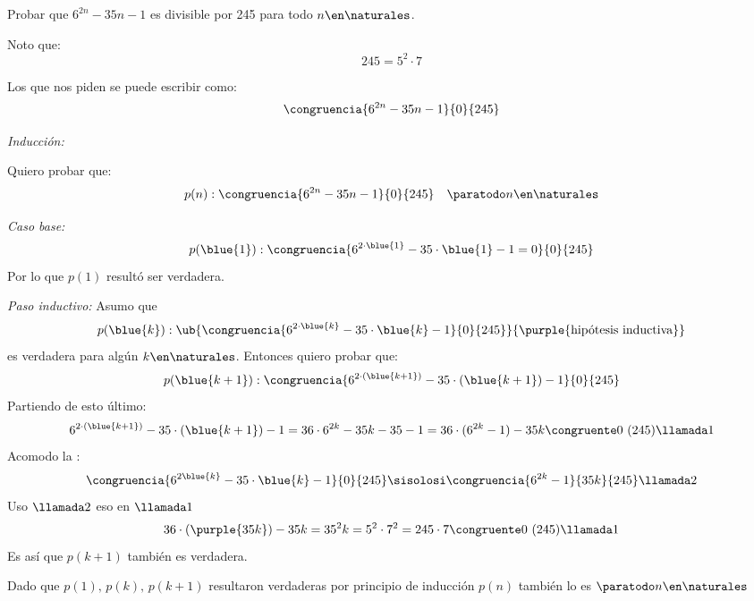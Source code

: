 \begin{enunciado}{\ejExtra}
	Probar que $6^{2n} - 35n -1$ es divisible por 245 para todo $n \en \naturales$.
\end{enunciado}

Noto que:
$$
	245 = 5^2 \cdot 7
$$

Los que nos piden se puede escribir como:
$$
	\congruencia{6^{2n} - 35n -1}{0}{245}
$$

\textit{Inducción:}

Quiero probar que:
$$
	p(n) : \congruencia{6^{2n} - 35n -1}{0}{245} \quad \paratodo n \en \naturales
$$

\medskip

\textit{Caso base:}
$$
	p(\blue{1}) :
	\congruencia{
		6^{2 \cdot \blue{1}} - 35 \cdot {\blue{1}} -1 = 0 }{0}{245}
$$
Por lo que $p(1)$ resultó ser verdadera.

\medskip

\textit{Paso inductivo:}
Asumo que
$$
	p(\blue{k}) : \ub{\congruencia{ 6^{2 \cdot \blue{k}} - 35 \cdot {\blue{k}} -1}{0}{245}}{\purple{\text{hipótesis inductiva}}}
$$
es verdadera para algún $k \en \naturales$. Entonces quiero probar que:
$$
	p(\blue{k+1}) : \congruencia{ 6^{2 \cdot (\blue{k+1})} - 35 \cdot ({\blue{k+1}}) -1}{0}{245}
$$
Partiendo de esto último:
$$
	6^{2 \cdot (\blue{k+1})} - 35 \cdot ({\blue{k+1}}) -1
	=
	36 \cdot 6^{2k} - 35k -35 -1
	=
	36 \cdot (6^{2k} - 1) - 35k \congruente 0 \ (245) \llamada1
$$
Acomodo la :
$$
	\congruencia{ 6^{2 \blue{k}} - 35 \cdot {\blue{k}} -1}{0}{245}
	\sisolosi
	\congruencia{ 6^{2 k} -1 }{35k}{245} \llamada2
$$
Uso $\llamada2$ eso en $\llamada1$
$$
	36 \cdot (\purple{35k}) - 35k = 35^2k = 5^2 \cdot 7^2= 245 \cdot 7 \congruente 0 \ (245) \llamada1
$$
Es así que $p(k+1)$ también es verdadera.

\bigskip

Dado que $p(1),\, p(k),\, p(k+1)$ resultaron verdaderas por principio de inducción $p(n)$ también lo es $\paratodo n \en \naturales$

\begin{aportes}
	\item {}
\end{aportes}
